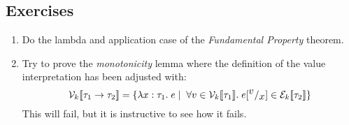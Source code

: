 \subsection*{Exercises}
\begin{enumerate}
\item Do the lambda and application case of the \emph{Fundamental Property} theorem.%
\item Try to prove the \emph{monotonicity} lemma where the definition of the value interpretation has been adjusted with:
\[
\mathcal{V}_{k}\llbracket  \tau_1 \rightarrow \tau_2 \rrbracket = \{\lambda x : \tau_1 . \; e \; | \; \; \forall v \in \mathcal{V}_{k}\llbracket \tau_1 \rrbracket. \; e[^{\textstyle v}/_{\textstyle x}] \in \mathcal{E}_{k}\llbracket \tau_2 \rrbracket \}
\]
This will fail, but it is instructive to see how it fails.
\end{enumerate}
